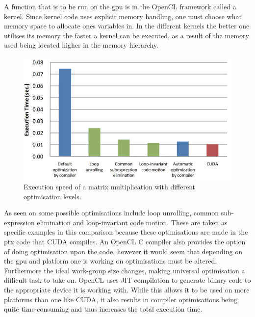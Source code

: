 
A function that is to be run on the \acrshort{gpu} is in the OpenCL framework called a kernel.
Since kernel code uses explicit memory handling, one must choose what memory space to allocate ones variables in.
In the different kernels the better one utilises its memory the faster a kernel can be executed, as a result of the memory used being located higher in the memory hierarchy.
\begin{figure}[h!]
\centering
 \includegraphics[width=1\textwidth]{figures/opencloptimisation.png} %
\caption{Execution speed of a matrix multiplication with different optimisation levels. \citep{CUDAOpenCLOptimisation}}\label{image:OpenCLOptCompare}
\vspace{-15pt}
\end{figure}
As seen on  some possible optimisations include loop unrolling, common sub-expression elimination and loop-invariant code motion. 
These are taken as specific examples in this comparison because these optimisations are made in the \acrlong{ptx} code that CUDA compiles.
An OpenCL C compiler also provides the option of doing optimisation upon the code, however it would seem that depending on the \acrshort{gpu} and platform one is working on optimisations must be altered.
Furthermore the ideal work-group size changes, making universal optimisation a difficult task to take on.
OpenCL uses JIT compilation to generate binary code to the appropriate device it is working with.
While this allows it to be used on more platforms than one like CUDA, it also results in compiler optimisations being quite time-consuming and thus increases the total execution time.\citep{CUDAOpenCLOptimisation}